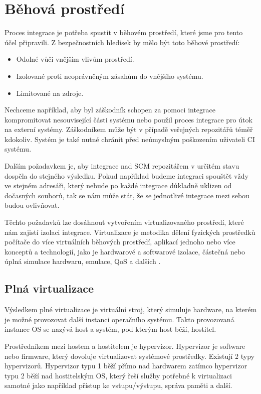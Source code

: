 \section{Běhová prostředí}

Proces integrace je potřeba spustit v běhovém prostředí, které jsme pro tento účel připravili.
Z bezpečnostních hledisek by mělo být toto běhové prostředí:

\begin{itemize}
	\item Odolné vůči vnějším vlivům prostředí.
	\item Izolované proti neoprávněným zásahům do vnějšího systému.
	\item Limitované na zdroje.
\end{itemize}

Nechceme například, aby byl záškodník schopen za pomoci integrace kompromitovat nesouvisející části systému nebo použil proces integrace pro útok na externí systémy.
Záškodníkem může být v případě veřejných repozitářů téměř kdokoliv.
Systém je také nutné chránit před neúmyslným poškozením uživateli CI systému.

Dalším požadavkem je, aby integrace nad SCM repozitářem v určitém stavu dospěla do stejného výsledku.
Pokud například budeme integraci spouštět vždy ve stejném adresáři, který nebude po každé integrace důkladně uklizen od dočasných souborů, tak se nám může stát, že se jednotlivé integrace mezi sebou budou ovlivňovat.

Těchto požadavků lze dosáhnout vytvořením virtualizovaného prostředí, které nám zajistí izolaci integrace.
Virtualizace je metodika dělení fyzických prostředků počítače do více virtuálních běhových prostředí, aplikací jednoho nebo více konceptů a technologií, jako je hardwarové a softwarové izolace, částečná nebo úplná simulace hardwaru, emulace, QoS a dalších \cite{virt_intro}.

\subsection{Plná virtualizace}

Výsledkem plné virtualizace je virtuální stroj, který simuluje hardware, na kterém je možné provozovat další instanci operačního systému.
Takto provozovaná instance OS se nazývá host a systém, pod kterým host běží, hostitel.

Prostředníkem mezi hostem a hostitelem je hypervizor.
Hypervizor je software nebo firmware, který dovoluje virtualizovat systémové prostředky.
Existují 2 typy hypervizorů.
Hypervizor typu 1 běží přímo nad hardwarem zatímco hypervizor typu 2 běží nad hostitelským OS, který řeší služby potřebné k virtualizaci samotné jako například přístup ke vstupu/výstupu, správa paměti a další.
\cite{hypervisor_def}

